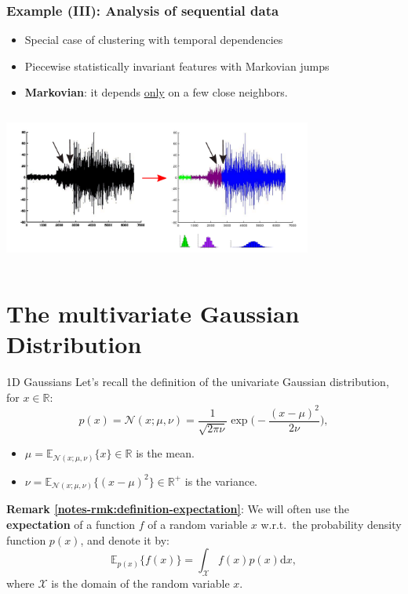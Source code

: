 \documentclass{beamer}
\newcommand{\remark}[2]{\noindent\colorbox{red!10}{\parbox{0.995\textwidth}{\textbf{Remark \ref{notes-rmk:#1}}: #2}}\\}
\begin{document}
\begin{frame} \frametitle{Example (III): Analysis of sequential data}
	\begin{itemize}
		\item Special case of clustering with temporal dependencies
		\item Piecewise statistically invariant features with Markovian jumps
		\item {\bf Markovian}: it depends \underline{only} on a few close neighbors.
	\end{itemize}
	\begin{center}
		\begin{columns}[t]
			\includegraphics[height=4.4cm]{fig/hmm.pdf}
		\end{columns}
	\end{center}

\end{frame}

\section{The multivariate Gaussian Distribution}

\begin{frame}{1D Gaussians}
 Let's recall the definition of the univariate Gaussian distribution, for $x\in\mathbb{R}$:
\[p(x) = \mathcal{N}(x;\mu,\nu) = \frac{1}{\sqrt{2\pi\nu}}\exp\Big(-\frac{(x-\mu)^2}{2\nu}\Big),\]
\begin{itemize}
 \item $\mu=\mathbb{E}_{\mathcal{N}(x;\mu,\nu)}\{x\}\in\mathbb{R}$ is the mean.
 \item $\nu=\mathbb{E}_{\mathcal{N}(x;\mu,\nu)}\{(x-\mu)^2\}\in\mathbb{R}^{+}$ is the variance.
\end{itemize}\vspace{3mm}
\pause
\remark{definition-expectation}{We will often use the \textbf{expectation} of a function $f$ of a random variable $x$ w.r.t.\ the probability density function $p(x)$, and denote it by:
\[
 \mathbb{E}_{p(x)}\{f(x)\} = \int_{\mathcal{X}} f(x)p(x)\textrm{d}x,
\]
where $\mathcal{X}$ is the domain of the random variable $x$.}
\end{frame}
\end{document}
